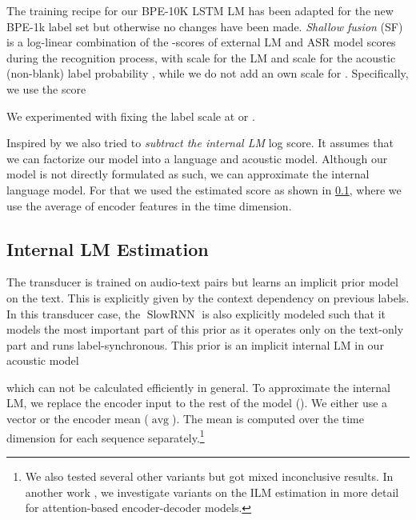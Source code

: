 \documentclass[a4paper]{article}
\newcommand{\decoder}{\ensuremath{\operatorname{SlowRNN}}}
\newcommand{\ilmAvgName}{\ensuremath{\operatorname{avg}}}
\begin{document}
The training recipe for our BPE-10K LSTM LM \cite{irie2020:phd}
has been adapted for the new BPE-1k label set
but otherwise no changes have been made.
\emph{Shallow fusion} (SF) \cite{gulcehre2016monolingual} is a log-linear combination
of the -scores of external LM and ASR model scores during the recognition process,
with scale  for the LM
and scale  for the acoustic (non-blank) label probability ,
while we do not add an own scale for .
Specifically, we use the score

We experimented with fixing the label scale at  or .





Inspired by \cite{mcdermott2019density,variani2020hat,meng2021ilm}
we also tried to \emph{subtract the internal LM} log score.
It assumes that we can factorize our model into a language and acoustic model.
Although our model is not directly formulated as such,
we can approximate the internal language model.
For that we used the estimated score 
as shown in \cref{sec:internal_lm_estimation},
where we use the average of encoder features in the time dimension.











\subsection{Internal LM Estimation}
\label{sec:internal_lm_estimation}

The transducer is trained on audio-text pairs
but learns an implicit prior model on the text.
This is explicitly given by the context dependency on previous labels.
In this transducer case, the \decoder{} is also explicitly modeled
such that it models the most important part of this prior
as it operates only on the text-only part
and runs label-synchronous.
This prior is an implicit internal LM in our acoustic model

which can not be calculated efficiently in general.
To approximate the internal LM,
we replace the encoder input
to the rest of the model ().
We either use a  vector or the encoder mean (\ilmAvgName).
The mean is computed over the time dimension for each sequence separately.\footnote{We also tested several other variants but got mixed inconclusive results.
In another work \cite{zeineldeen2021ilm}, we investigate variants on the ILM estimation in more detail
for attention-based encoder-decoder models.}
\end{document}
